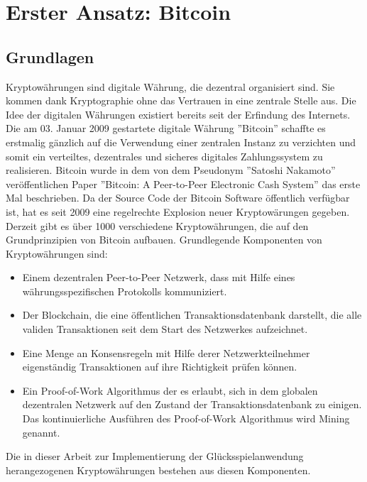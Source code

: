 \chapter{Erster Ansatz: Bitcoin}
\label{btc}

\section{Grundlagen}
\iffalse
Kryptowährungen sind digitale Währung, die dezentral organisiert sind. Sie kommen dank Kryptographie ohne das Vertrauen in eine zentrale Stelle aus. Die Idee der digitalen Währungen existiert bereits seit der Erfindung des Internets. Die am 03. Januar 2009 gestartete  digitale Währung ''Bitcoin'' schaffte es erstmalig gänzlich auf die Verwendung einer zentralen Instanz zu verzichten und somit ein verteiltes, dezentrales und sicheres digitales Zahlungssystem zu realisieren.
Bitcoin wurde in dem von dem Pseudonym ''Satoshi Nakamoto'' veröffentlichen Paper ''Bitcoin: A Peer-to-Peer Electronic Cash System'' das erste Mal beschrieben. 
Da der Source Code der Bitcoin Software öffentlich verfügbar ist, hat es seit 2009 eine regelrechte Explosion neuer Kryptowärungen gegeben.
Derzeit gibt es über 1000 verschiedene Kryptowährungen, die auf den Grundprinzipien von Bitcoin aufbauen. 
Grundlegende Komponenten von Kryptowährungen sind:

\begin{itemize}
\item Einem dezentralen Peer-to-Peer Netzwerk, dass mit Hilfe eines währungsspezifischen Protokolls kommuniziert.
\item Der Blockchain, die eine öffentlichen Transaktionsdatenbank darstellt, die alle validen Transaktionen seit dem Start des Netzwerkes aufzeichnet.
\item Eine Menge an Konsensregeln mit Hilfe derer Netzwerkteilnehmer eigenständig Transaktionen auf ihre Richtigkeit prüfen können.
\item Ein Proof-of-Work Algorithmus der es erlaubt, sich in dem globalen dezentralen Netzwerk auf den Zustand der Transaktionsdatenbank zu einigen. Das kontinuierliche Ausführen des Proof-of-Work Algorithmus wird Mining genannt.
\end{itemize}

Die in dieser Arbeit zur Implementierung der Glücksspielanwendung herangezogenen Kryptowährungen bestehen aus diesen Komponenten.


